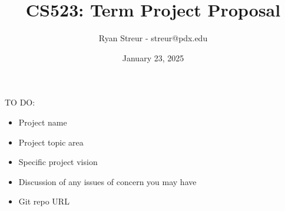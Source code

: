 \documentclass{article}
\title{CS523: Term Project Proposal}
\author{Ryan Streur - streur@pdx.edu}
\date{January 23, 2025}
\begin{document}
  \maketitle 

  TO DO: 

  \begin{itemize}
    \item Project name
    \item Project topic area
    \item Specific project vision
    \item Discussion of any issues of concern you may have
    \item Git repo URL
  \end{itemize}
\end{document}
